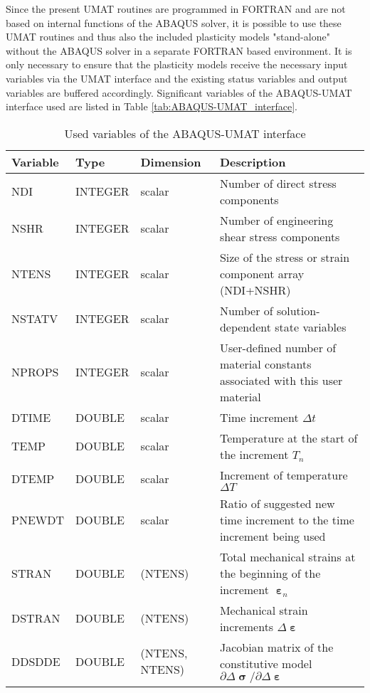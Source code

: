 Since the present UMAT routines are programmed in FORTRAN and are not based on internal functions of the ABAQUS solver, it is possible to use these UMAT routines and thus also the included plasticity models "stand-alone" without the ABAQUS solver in a separate FORTRAN based environment.
It is only necessary to ensure that the plasticity models receive the necessary input variables via the UMAT interface and the existing status variables and output variables are buffered accordingly.
Significant variables of the ABAQUS-UMAT interface used are listed in Table \ref{tab:ABAQUS-UMAT_interface}.

\begin{table}[htbp]
  \centering
  \caption{Used variables of the ABAQUS-UMAT interface}
    \begin{tabular}{p{2cm}p{2cm}p{2cm}p{8cm}}
    \toprule
    Variable & Type  & Dimension & Description \\
    \midrule
    NDI   & INTEGER & scalar & Number of direct stress components \\
    NSHR  & INTEGER & scalar & Number of engineering shear stress components \\
    NTENS & INTEGER & scalar & Size of the stress or strain component array (NDI+NSHR) \\
    NSTATV & INTEGER & scalar & Number of solution-dependent state variables \\
    NPROPS & INTEGER & scalar & User-defined number of material constants associated with this user material \\
    DTIME & DOUBLE & scalar & Time increment $\Delta t$ \\
    TEMP  & DOUBLE & scalar & Temperature at the start of the increment $T_n$ \\
    DTEMP & DOUBLE & scalar & Increment of temperature $\Delta T$ \\
    PNEWDT & DOUBLE & scalar & Ratio of suggested new time increment to the time increment being used \\
    STRAN & DOUBLE & (NTENS) & Total mechanical strains at the beginning of the increment $\bm{\upepsilon}_n$ \\
    DSTRAN & DOUBLE & (NTENS) & Mechanical strain increments $\Delta \bm{\upepsilon}$ \\
    DDSDDE & DOUBLE & (NTENS, NTENS) & Jacobian matrix of the constitutive model $\partial\Delta {\bm{\upsigma }} /\partial\Delta {\bm{\upepsilon }}$ \\

\end{tabular}
\end{table}
